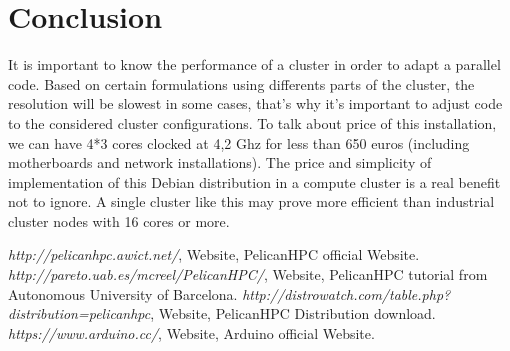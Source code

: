 \documentclass[11pt,a4paper]{article}
\begin{document}
\section{Conclusion}
\noindent
It is important to know the performance of a cluster in order to adapt a parallel code. Based on certain formulations using differents parts of the cluster, the resolution will be slowest in some cases, that's why it's important to adjust code to the considered cluster configurations. To talk about price of this installation, we can have 4*3 cores clocked at 4,2 Ghz for less than 650 euros (including motherboards and network installations). The price and simplicity of implementation of this Debian distribution in a compute cluster is a real benefit not to ignore. A single cluster like this may prove more efficient than industrial cluster nodes with 16 cores or more.
\begin{thebibliography}{1}
 \emph{http://pelicanhpc.awict.net/}, Website, PelicanHPC official Website. 
 \emph{http://pareto.uab.es/mcreel/PelicanHPC/}, Website, PelicanHPC tutorial from Autonomous University of Barcelona. 
 \emph{http://distrowatch.com/table.php?distribution=pelicanhpc}, Website, PelicanHPC Distribution download. 
 \emph{https://www.arduino.cc/}, Website, Arduino official Website. 

\end{thebibliography}
\end{document}

